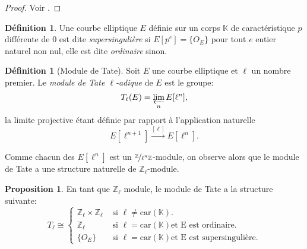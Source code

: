 \documentclass[10pt,a4paper]{book}
\theoremstyle{plain}
\theoremstyle{definition}
\theoremstyle{definition}
\theoremstyle{definition}
\newtheorem{prop}[thm]{Proposition}
\theoremstyle{definition}
\newtheorem{defi}[thm]{Définition}
\theoremstyle{remark}
\theoremstyle{remark}
\theoremstyle{definition}
\begin{document}
\begin{proof}
Voir \cite[Corrolary III.6.4]{Silv1}.
\end{proof}

\begin{defi}
Une courbe elliptique $E$ définie sur un corps $\mathbb{K}$ de caractéristique $p$ différente de $0$ est dite \emph{supersingulière} si $E[p^e]=\{O_E\}$ pour tout $e$ entier naturel non nul, elle est dite \emph{ordinaire} sinon. 
\end{defi}

\begin{defi}[Module de Tate]
Soit $E$ une courbe elliptique et $\ell$ un nombre premier. Le \emph{module de Tate $\ell$-adique} de $E$ est le groupe:
\begin{equation*}
T_{\ell}(E)=\varprojlim_nE[\ell^n],
\end{equation*}
la limite projective étant définie par rapport à l'application naturelle
\begin{equation*}
E[\ell^{n+1}] \overset{[\ell]}{\rightarrow} E[\ell^n].
\end{equation*}
\end{defi}
Comme chacun des $E[\ell^n]$ est un $\nicefrac{\mathbb{Z}}{\ell^n\mathbb{Z}}$-module, on observe alors que le module de Tate a une structure naturelle de $\mathbb{Z}_{\ell}$-module.
\begin{prop}
En tant que $\mathbb{Z}_{\ell}$ module, le module de Tate a la structure suivante:
\begin{equation*}
T_{\ell} \cong 
\begin{cases} 
\mathbb{Z}_{\ell} \times \mathbb{Z}_{\ell} &\text{ si } \ell \neq \mathrm{car}(\mathbb{K}). \\
\mathbb{Z}_{\ell} &\text{ si } \ell=\mathrm{car}(\mathbb{K})  \text{et E est ordinaire}. \\
\{O_E\} &\text{ si } \ell=\mathrm{car}(\mathbb{K})  \text{et E est supersingulière}.
\end{cases}
\end{equation*}
\end{prop}

\end{document}
